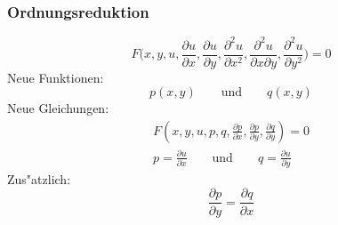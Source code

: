 \begin{frame}
\frametitle{Ordnungsreduktion}
\[
F\biggl(x,y,u,
\frac{\partial u}{\partial x},
\frac{\partial u}{\partial y},
\frac{\partial^2 u}{\partial x^2},
\frac{\partial^2 u}{\partial x\partial y},
\frac{\partial^2 u}{\partial y^2}
\biggr)=0
\]
\pause
Neue Funktionen:
\[
p(x,y)\qquad\text{und}\qquad q(x,y)
\]
\pause
Neue Gleichungen:
\begin{gather*}
F(x,y,u,p,q,\frac{\partial p}{\partial x},\frac{\partial p}{\partial y},
\frac{\partial q}{\partial y})=0
\\
p=\frac{\partial u}{\partial x}\qquad\text{und}\qquad
q=\frac{\partial u}{\partial y}
\end{gather*}
\pause
Zus"atzlich:
\[
\frac{\partial p}{\partial y}=\frac{\partial q}{\partial x}
\]
\end{frame}


